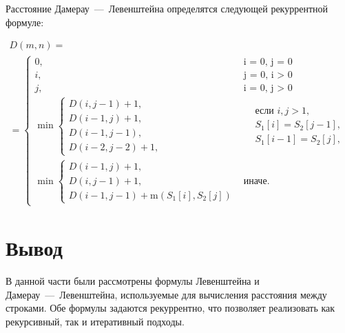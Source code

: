 Расстояние Дамерау~---~Левенштейна определятся следующей рекуррентной формуле:

\begin{multline}
    D(m, n) =\\ =
    \begin{cases}
        0, &\text{i = 0, j = 0}\\
        i, &\text{j = 0, i > 0}\\
        j, &\text{i = 0, j > 0}\\
        \min
        \begin{cases}
            D(i, j - 1) + 1,\\
            D(i - 1, j) + 1,\\
            D(i - 1, j - 1),\\
            D(i - 2, j - 2) + 1,
        \end{cases} 
        &\begin{aligned}
            & \text{если $i, j > 1$}, \\
            & S_{1}[i] = S_{2}[j - 1], \\
            & S_{1}[i - 1] = S_{2}[j],
        \end{aligned} \\
        \min
        \begin{cases}
            D(i - 1, j) + 1, \\
            D(i, j - 1) + 1, \\
            D(i - 1, j - 1) + \text{m}(S_1[i], S_2[j])
        \end{cases} &\text{иначе.}
    \end{cases}
    \label{eqn:recur-damlev}
\end{multline}

\section*{Вывод}
В данной части были рассмотрены формулы Левенштейна и Дамерау~---~Левенштейна, используемые для вычисления расстояния между строками. Обе формулы задаются рекуррентно, что позволяет реализовать как рекурсивный, так и итеративный подходы.